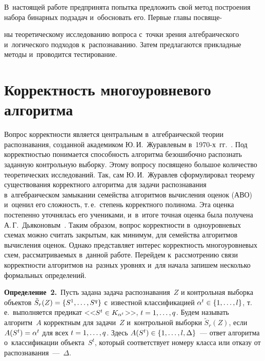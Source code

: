 \begin{multicols}{2}
В~настоящей работе предпринята попытка предложить свой метод построения 
набора бинарных подзадач и~обосновать его.
Первые главы посвяще-\linebreak\vspace*{-12pt}

\pagebreak

\noindent
ны теоретическому исследованию вопроса 
с~точки зрения алгебраического и~логического подходов к~распознаванию.
Затем предлагаются прикладные методы и~проводится тестирование.

\section{Корректность многоуровневого алгоритма} %

Вопрос корректности является центральным в~алгебраической теории распознавания, 
созданной академиком Ю.\,И.~Журавлевым в~1970-х~гг.~\cite{zhur1, zhur2}.
Под корректностью понимается способность алгоритма безошибочно распознать 
заданную контрольную выборку.
Этому вопросу посвящено большое количество теоретических исследований.
Так, сам Ю.\,И.~Журавлев сформулировал теорему существования корректного 
алгоритма для задачи распознавания в~алгебраическом замыкании 
семейства алгоритмов вычисления оценок (АВО)~\cite{zhur1,zhur2} 
и~оценил его сложность, т.\,е.\ степень корректного полинома.
Эта оценка постепенно уточнялась его учениками, и~в~итоге 
точная оценка была получена А.\,Г.~Дьяконовым~\cite{djakonov}.
Таким образом, вопрос корректности в~одноуровневых схемах можно считать 
закрытым, как минимум, для семейства алгоритмов вычисления оценок.
Однако представляет интерес корректность многоуровневых схем, рассматриваемых 
в~данной работе.
Перейдем к~рассмотрению связи корректности алгоритмов на~разных уровнях 
и~для начала запишем несколько формальных определений.

\smallskip

\noindent
\textbf{Определение~2.}\
Пусть задана задача распознавания~$Z$ и контрольная выборка 
объектов $\tilde{S}_r(Z)\hm=\{S^1,\ldots,S^q\}$ с~известной классификацией 
$\alpha^t\hm\in\{1,\ldots,l\}$, т.\,е.\ выполняется предикат 
<<$S^t\hm\in K_{\alpha^t}$>>, $t\hm=1,\ldots,q$.
Будем называть алгоритм~$A$ корректным для задачи~$Z$ 
и~контрольной выборки $\tilde{S}_r(Z)$, если $A(S^t)\hm=\alpha^t$ для всех 
$t\hm=1,\ldots,q$.
Здесь $A(S^t)\hm\in\{1,\ldots,l,\Delta\}$~--- ответ алгоритма 
о~классификации объекта~$S^t$, который соответствует номеру класса или отказу 
от распознавания~---~$\Delta$.



\end{multicols}
